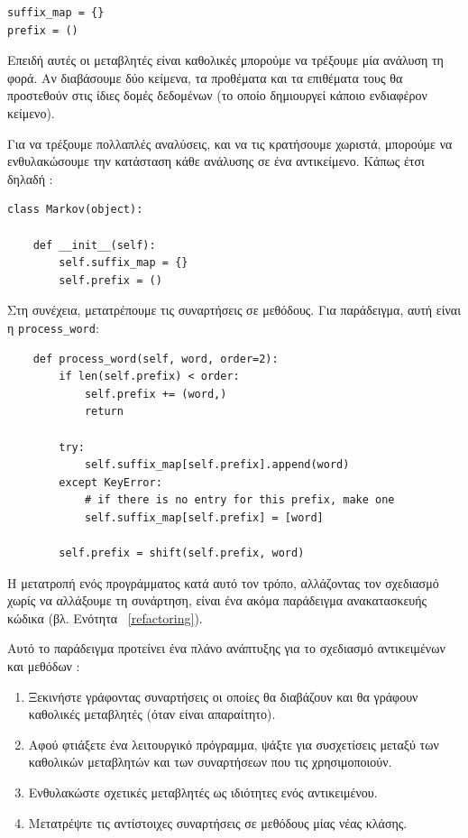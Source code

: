 \documentclass[10pt]{book}
\begin{document}
\begin{verbatim}
suffix_map = {}
prefix = ()
\end{verbatim}

 Επειδή αυτές οι μεταβλητές είναι καθολικές μπορούμε να τρέξουμε μία ανάλυση τη φορά. 
Αν διαβάσουμε δύο κείμενα, τα προθέματα και τα επιθέματα τους θα προστεθούν στις ίδιες 
δομές δεδομένων (το οποίο δημιουργεί κάποιο ενδιαφέρον κείμενο).

Για να τρέξουμε πολλαπλές αναλύσεις, και να τις κρατήσουμε χωριστά, μπορούμε να ενθυλακώσουμε την κατάσταση κάθε ανάλυσης σε ένα αντικείμενο. Κάπως έτσι δηλαδή :

\begin{verbatim}
class Markov(object):

    def __init__(self):
        self.suffix_map = {}
        self.prefix = ()
\end{verbatim}

 Στη συνέχεια, μετατρέπουμε τις συναρτήσεις σε μεθόδους. Για παράδειγμα, αυτή 
είναι η  \verb"process_word":

\begin{verbatim}
    def process_word(self, word, order=2):
        if len(self.prefix) < order:
            self.prefix += (word,)
            return

        try:
            self.suffix_map[self.prefix].append(word)
        except KeyError:
            # if there is no entry for this prefix, make one
            self.suffix_map[self.prefix] = [word]

        self.prefix = shift(self.prefix, word)
\end{verbatim}

 Η μετατροπή ενός προγράμματος κατά αυτό τον τρόπο, αλλάζοντας τον σχεδιασμό χωρίς να αλλάξουμε τη συνάρτηση, είναι ένα ακόμα παράδειγμα ανακατασκευής κώδικα (βλ. Ενότητα~ \ref{refactoring}).

 Αυτό το παράδειγμα προτείνει ένα πλάνο ανάπτυξης για το σχεδιασμό αντικειμένων και μεθόδων :

\begin{enumerate}

 
\item Ξεκινήστε γράφοντας συναρτήσεις οι οποίες θα διαβάζουν και θα γράφουν καθολικές 
μεταβλητές (όταν είναι απαραίτητο).

\item Αφού φτιάξετε ένα λειτουργικό πρόγραμμα, ψάξτε για συσχετίσεις μεταξύ των καθολικών 
μεταβλητών και των συναρτήσεων που τις χρησιμοποιούν.

\item Ενθυλακώστε σχετικές μεταβλητές ως ιδιότητες ενός αντικειμένου.

\item Μετατρέψτε τις αντίστοιχες συναρτήσεις σε μεθόδους μίας νέας κλάσης.
 

\end{enumerate}
\end{document}
